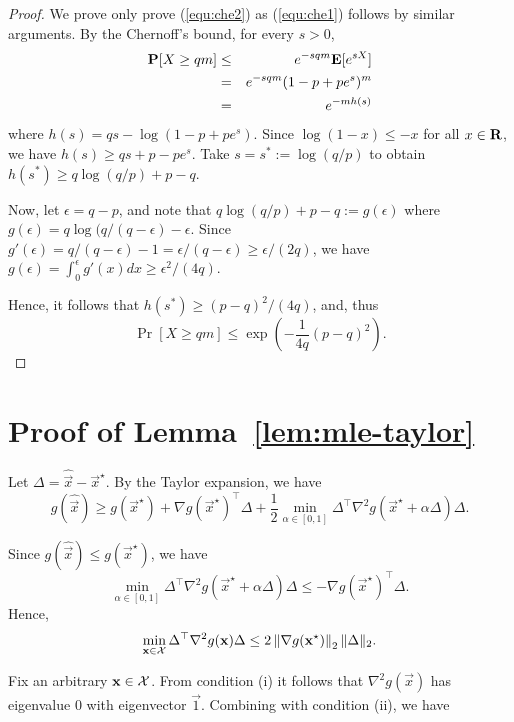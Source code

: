 \begin{proof} We prove only prove (\ref{equ:che2}) as (\ref{equ:che1}) follows by similar arguments. By the Chernoff's bound, for every $s > 0$,
\begin{eqnarray*}
\mathbf{P}[X \geq q m] & \leq & e^{-s qm}\mathbf{E}[e^{sX}]\\
&=& e^{-sqm} (1-p+pe^s)^m\\
&=& e^{-m h(s)}
\end{eqnarray*}
where $h(s) = qs - \log(1-p+pe^s)$.
Since $\log(1-x) \leq -x$ for all $x\in \mathbf{R}$, we have $h(s) \geq qs +p - p e^s$. Take $s = s^* := \log(q/p)$ to obtain $h(s^*) \geq q \log(q/p) + p - q$.

Now, let $\epsilon = q-p$, and note that $q \log(q/p) + p - q := g(\epsilon)$ where $g(\epsilon) = q \log(q/(q-\epsilon) - \epsilon$. Since $g'(\epsilon) = q/(q-\epsilon) - 1 
= \epsilon/(q-\epsilon) \geq \epsilon/(2q)$, we have $g(\epsilon) = \int_0^\epsilon g'(x)dx \geq \epsilon^2/(4q)$.

Hence, it follows that $h(s^*) \geq (p-q)^2/(4q)$, and, thus
$$
\Pr[X\geq q m] \leq \exp\left(-\frac{1}{4q}(p-q)^2\right).
$$
\end{proof}

\section{Proof of Lemma~\ref{lem:mle-taylor}}

Let $\Delta = \widehat{\vec{x}} - \vec{x}^\star$. By the Taylor expansion, we have
\begin{equation}
g(\widehat{\vec{x}}) \ge g(\vec{x}^\star) + \nabla g (\vec{x}^\star)^\top \Delta  +\frac{1}{2} \min_{\alpha \in [0,1]} \Delta^\top \nabla^2 g (\vec{x}^\star+\alpha \Delta) \Delta.
\label{eq:taylor-pair}
\end{equation}

Since $g(\widehat{\vec{x}}) \leq g(\vec{x}^\star)$, we have
$$
\min_{\alpha \in [0,1]} \Delta^\top \nabla^2 g (\vec{x}^\star+\alpha \Delta) \Delta \leq -\nabla g (\vec{x}^\star)^\top \Delta.
$$
Hence, 
\begin{equation}
\min_{\mathbf{x} \in {\mathcal X}} \Delta^\top \nabla^2 g(\mathbf{x}) \Delta \le 2  \left\|\nabla g(\mathbf{x}^\star)\right\|_2 \| \Delta \|_2.
\label{eq:taylor-2}
\end{equation}

Fix an arbitrary $\mathbf{x}\in {\mathcal X}$. From condition (i) it follows that $\nabla^2 g(\vec{x})$ has eigenvalue $0$ with eigenvector $\vec{1}$. Combining with condition (ii), we have

